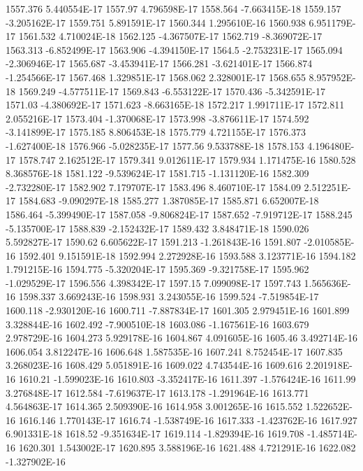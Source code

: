 1557.376  5.440554E-17
1557.97  4.796598E-17
1558.564  -7.663415E-18
1559.157  -3.205162E-17
1559.751  5.891591E-17
1560.344  1.295610E-16
1560.938  6.951179E-17
1561.532  4.710024E-18
1562.125  -4.367507E-17
1562.719  -8.369072E-17
1563.313  -6.852499E-17
1563.906  -4.394150E-17
1564.5  -2.753231E-17
1565.094  -2.306946E-17
1565.687  -3.453941E-17
1566.281  -3.621401E-17
1566.874  -1.254566E-17
1567.468  1.329851E-17
1568.062  2.328001E-17
1568.655  8.957952E-18
1569.249  -4.577511E-17
1569.843  -6.553122E-17
1570.436  -5.342591E-17
1571.03  -4.380692E-17
1571.623  -8.663165E-18
1572.217  1.991711E-17
1572.811  2.055216E-17
1573.404  -1.370068E-17
1573.998  -3.876611E-17
1574.592  -3.141899E-17
1575.185  8.806453E-18
1575.779  4.721155E-17
1576.373  -1.627400E-18
1576.966  -5.028235E-17
1577.56  9.533788E-18
1578.153  4.196480E-17
1578.747  2.162512E-17
1579.341  9.012611E-17
1579.934  1.171475E-16
1580.528  8.368576E-18
1581.122  -9.539624E-17
1581.715  -1.131120E-16
1582.309  -2.732280E-17
1582.902  7.179707E-17
1583.496  8.460710E-17
1584.09  2.512251E-17
1584.683  -9.090297E-18
1585.277  1.387085E-17
1585.871  6.652007E-18
1586.464  -5.399490E-17
1587.058  -9.806824E-17
1587.652  -7.919712E-17
1588.245  -5.135700E-17
1588.839  -2.152432E-17
1589.432  3.848471E-18
1590.026  5.592827E-17
1590.62  6.605622E-17
1591.213  -1.261843E-16
1591.807  -2.010585E-16
1592.401  9.151591E-18
1592.994  2.272928E-16
1593.588  3.123771E-16
1594.182  1.791215E-16
1594.775  -5.320204E-17
1595.369  -9.321758E-17
1595.962  -1.029529E-17
1596.556  4.398342E-17
1597.15  7.099098E-17
1597.743  1.565636E-16
1598.337  3.669243E-16
1598.931  3.243055E-16
1599.524  -7.519854E-17
1600.118  -2.930120E-16
1600.711  -7.887834E-17
1601.305  2.979451E-16
1601.899  3.328844E-16
1602.492  -7.900510E-18
1603.086  -1.167561E-16
1603.679  2.978729E-16
1604.273  5.929178E-16
1604.867  4.091605E-16
1605.46  3.492714E-16
1606.054  3.812247E-16
1606.648  1.587535E-16
1607.241  8.752454E-17
1607.835  3.268023E-16
1608.429  5.051891E-16
1609.022  4.743544E-16
1609.616  2.201918E-16
1610.21  -1.599023E-16
1610.803  -3.352417E-16
1611.397  -1.576424E-16
1611.99  3.276848E-17
1612.584  -7.619637E-17
1613.178  -1.291964E-16
1613.771  4.564863E-17
1614.365  2.509390E-16
1614.958  3.001265E-16
1615.552  1.522652E-16
1616.146  1.770143E-17
1616.74  -1.538749E-16
1617.333  -1.423762E-16
1617.927  6.901331E-18
1618.52  -9.351634E-17
1619.114  -1.829394E-16
1619.708  -1.485714E-16
1620.301  1.543002E-17
1620.895  3.588196E-16
1621.488  4.721291E-16
1622.082  -1.327902E-16
